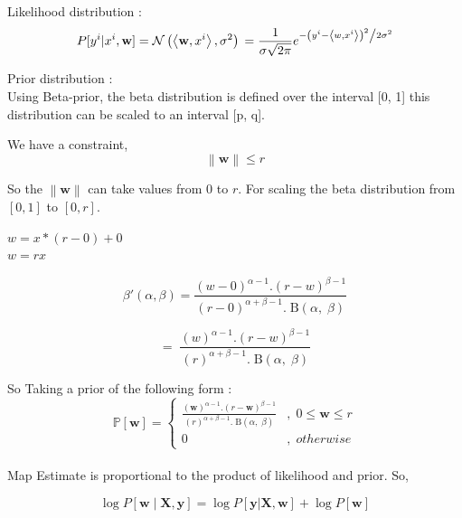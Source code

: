 \documentclass[a4paper,11pt]{article}
\begin{document}
\begin{mlsolution}

Likelihood distribution :
\[
P[y^{i}|x^{i}, \textbf{w}] = \mathcal{N} \left ( \left \langle \textbf{w}, x^{i} \right \rangle, \sigma^{2} \right ) \\
= \frac{1}{{\sigma \sqrt {2\pi } }}e^{{{ - \left( {y^{i} - \left \langle w, x^{i} \right \rangle } \right)^2 } \mathord{\left/ {\vphantom {{ - \left( {y^{i} - \left \langle w, x^{i} \right \rangle } \right)^2 } {2\sigma ^2 }}} \right. \kern-\nulldelimiterspace} {2\sigma ^2 }}}
\]

Prior distribution : \\

Using Beta-prior, the beta distribution is defined over the interval [0, 1] this distribution can be scaled to an interval [p, q].

We have a constraint, \[\left \| \textbf{w} \right \| \leq r \]

So the $\left \| \textbf{w} \right\|$ can take values from $0$ to $r$. For scaling the beta distribution from $[0, 1]$ to $[0, r]$.

$w = x*(r-0) + 0$\\

$w = rx$

\[
\beta{}'\left ( \alpha, \beta \right ) = \frac{\left ( w - 0 \right )^{\alpha - 1} . \left ( r - w \right )^{\beta - 1}}{\left ( r - 0 \right )^{\alpha + \beta - 1}.\; \text{B}\left ( \alpha, \;\beta \right ) }
\]

\[
= \; \frac{\left ( w \right )^{\alpha - 1} . \left ( r - w \right )^{\beta - 1}}{\left ( r \right )^{\alpha + \beta - 1}.\; \text{B}\left ( \alpha, \;\beta \right ) }
\]

So Taking a prior of the following form : \\

\[
\mathbb{P}\left [ \textbf{w} \right ] = \left\{\begin{matrix}
\frac{\left (\textbf{w} \right )^{\alpha - 1} . \left ( r - \textbf{w} \right )^{\beta - 1}}{\left ( r \right )^{\alpha + \beta - 1}.\; \text{B}\left ( \alpha, \;\beta \right ) } & ,\;0 \leq \textbf{w} \leq r\\ 
0 &,\; otherwise
\end{matrix}\right.
\]\\

Map Estimate is proportional to the product of likelihood and prior. So,

\[
\log P[\textbf{w}\mid\textbf{X},\textbf{y}]  = \log P[\textbf{y}|\textbf{X}, \textbf{w}] + \log P[\textbf{w}]
\]\\


\end{mlsolution}
\end{document}
